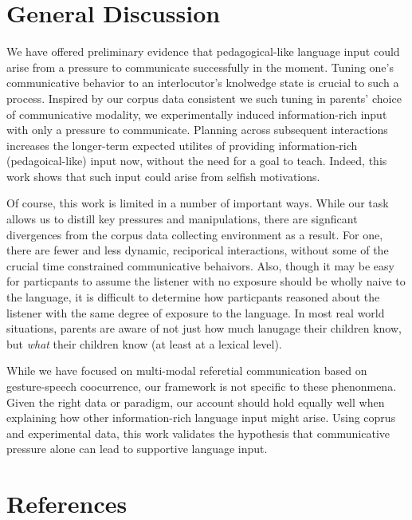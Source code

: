 \documentclass[10pt, letterpaper]{article}
\begin{document}
\hypertarget{general-discussion}{%
\section{General Discussion}\label{general-discussion}}

We have offered preliminary evidence that pedagogical-like language
input could arise from a pressure to communicate successfully in the
moment. Tuning one's communicative behavior to an interlocutor's
knolwedge state is crucial to such a process. Inspired by our corpus
data consistent we such tuning in parents' choice of communicative
modality, we experimentally induced information-rich input with only a
pressure to communicate. Planning across subsequent interactions
increases the longer-term expected utilites of providing
information-rich (pedagoical-like) input now, without the need for a
goal to teach. Indeed, this work shows that such input could arise from
selfish motivations.

Of course, this work is limited in a number of important ways. While our
task allows us to distill key pressures and manipulations, there are
signficant divergences from the corpus data collecting environment as a
result. For one, there are fewer and less dynamic, reciporical
interactions, without some of the crucial time constrained communicative
behaivors. Also, though it may be easy for particpants to assume the
listener with no exposure should be wholly naive to the language, it is
difficult to determine how particpants reasoned about the listener with
the same degree of exposure to the language. In most real world
situations, parents are aware of not just how much lanugage their
children know, but \emph{what} their children know (at least at a
lexical level).

While we have focused on multi-modal referetial communication based on
gesture-speech coocurrence, our framework is not specific to these
phenonmena. Given the right data or paradigm, our account should hold
equally well when explaining how other information-rich language input
might arise. Using coprus and experimental data, this work validates the
hypothesis that communicative pressure alone can lead to supportive
language input.

\hypertarget{references}{%
\section{References}\label{references}}

\setlength{\parindent}{-0.1in} 
\setlength{\leftskip}{0.125in}
\end{document}
